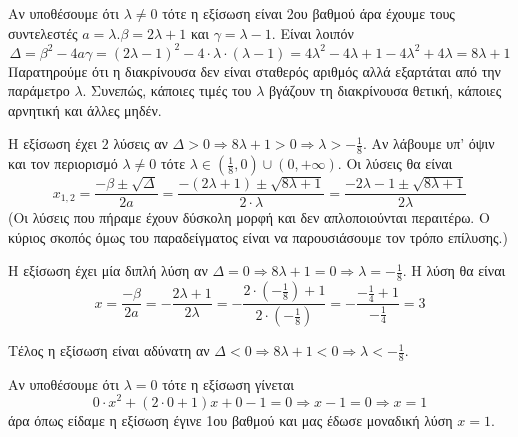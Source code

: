 \documentclass[11pt,a4paper]{article}
\begin{document}
\begin{Alist}
\item Αν υποθέσουμε ότι $ \lambda\neq 0 $ τότε η εξίσωση είναι 2ου βαθμού άρα έχουμε τους συντελεστές $ a=\lambda.\beta=2\lambda+1 $ και $ \gamma=\lambda-1 $. Είναι λοιπόν
\[ \Delta=\beta^2-4a\gamma=(2\lambda-1)^2-4\cdot\lambda\cdot(\lambda-1)=4\lambda^2-4\lambda+1-4\lambda^2+4\lambda=8\lambda+1 \]
Παρατηρούμε ότι η διακρίνουσα δεν είναι σταθερός αριθμός αλλά εξαρτάται από την παράμετρο $ \lambda $. Συνεπώς, κάποιες τιμές του $ \lambda $ βγάζουν τη διακρίνουσα θετική, κάποιες αρνητική και άλλες μηδέν.
\begin{rlist}
\item Η εξίσωση έχει $ 2 $ λύσεις αν $ \Delta>0\Rightarrow 8\lambda+1>0\Rightarrow \lambda>-\frac{1}{8} $. Αν λάβουμε υπ' όψιν και τον περιορισμό $ \lambda\neq 0 $ τότε $ \lambda\in\left(\frac{1}{8},0\right)\cup(0,+\infty) $. Οι λύσεις θα είναι
\[ x_{1,2}=\frac{-\beta\pm\sqrt{\Delta}}{2a}=\frac{-(2\lambda+1)\pm\sqrt{8\lambda+1}}{2\cdot\lambda}=\frac{-2\lambda-1\pm\sqrt{8\lambda+1}}{2\lambda} \]
(Οι λύσεις που πήραμε έχουν δύσκολη μορφή και δεν απλοποιούνται περαιτέρω. Ο κύριος σκοπός όμως του παραδείγματος είναι να παρουσιάσουμε τον τρόπο επίλυσης.)
\item Η εξίσωση έχει μία διπλή λύση αν $ \Delta=0\Rightarrow 8\lambda+1=0\Rightarrow \lambda=-\frac{1}{8} $. Η λύση θα είναι 
\[ x=\frac{-\beta}{2a}=-\frac{2\lambda+1}{2\lambda}=-\frac{2\cdot\left(-\frac{1}{8}\right)+1}{2\cdot\left(-\frac{1}{8}\right)}=-\frac{-\frac{1}{4}+1}{-\frac{1}{4}}=3 \]
\item Τέλος η εξίσωση είναι αδύνατη αν $ \Delta<0\Rightarrow 8\lambda+1<0\Rightarrow \lambda<-\frac{1}{8} $.
\end{rlist}
\item Αν υποθέσουμε ότι $ \lambda=0 $ τότε η εξίσωση γίνεται
\[ 0\cdot x^2+(2\cdot 0+1)x+0-1=0\Rightarrow x-1=0\Rightarrow x=1 \]
άρα όπως είδαμε η εξίσωση έγινε 1ου βαθμού και μας έδωσε μοναδική λύση $ x=1 $.
\end{Alist}
\end{document}

